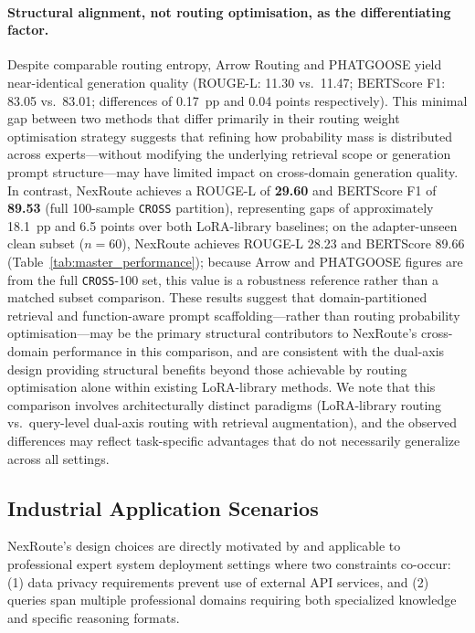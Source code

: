 \documentclass[a4paper,fleql,doubleblind]{cas-sc}
\begin{document}
\paragraph{Structural alignment, not routing optimisation, as the differentiating factor.}
Despite comparable routing entropy, Arrow Routing and PHATGOOSE yield near-identical
generation quality (ROUGE-L: 11.30 vs.\ 11.47; BERTScore F1: 83.05 vs.\ 83.01;
differences of 0.17~pp and 0.04 points respectively). This minimal gap between two
methods that differ primarily in their routing weight optimisation strategy suggests
that refining how probability mass is distributed across experts---without modifying
the underlying retrieval scope or generation prompt structure---may have limited
impact on cross-domain generation quality. In contrast, NexRoute achieves a
ROUGE-L of \textbf{29.60} and BERTScore F1 of \textbf{89.53} (full 100-sample
\texttt{CROSS} partition), representing gaps of approximately 18.1~pp and 6.5
points over both LoRA-library baselines; on the adapter-unseen clean subset
($n{=}60$), NexRoute achieves ROUGE-L 28.23 and BERTScore 89.66 (Table~\ref{tab:master_performance});
because Arrow and PHATGOOSE figures are from the full \texttt{CROSS}-100 set, this value
is a robustness reference rather than a matched subset comparison.
These results suggest that domain-partitioned retrieval and function-aware
prompt scaffolding---rather than routing probability optimisation---may be
the primary structural contributors to NexRoute's cross-domain performance
in this comparison, and are consistent with the dual-axis design providing structural benefits
beyond those achievable by routing optimisation alone within existing LoRA-library methods.
We note that this comparison involves architecturally distinct paradigms
(LoRA-library routing vs.\ query-level dual-axis routing with retrieval
augmentation), and the observed differences may reflect task-specific advantages
that do not necessarily generalize across all settings.

\subsection{Industrial Application Scenarios}
\label{ssec:applications}

NexRoute's design choices are directly motivated by and applicable to professional
expert system deployment settings where two constraints co-occur:
(1) data privacy requirements prevent use of external API services, and
(2) queries span multiple professional domains requiring both specialized knowledge
and specific reasoning formats.
\end{document}
